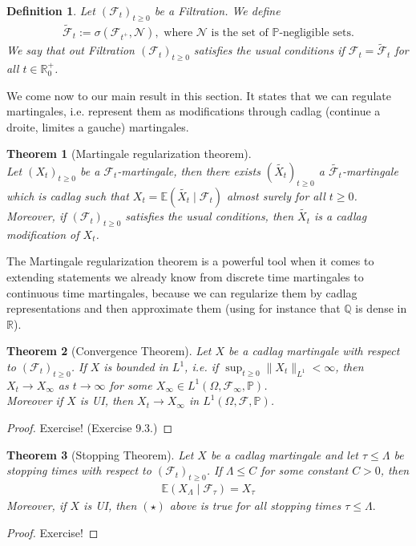 \documentclass[11pt,a4paper, final]{article}
\newtheorem{thm}{Theorem}[section]
\newtheorem{defn}{Definition}[section]
\theoremstyle{definition}
\begin{document}
\begin{defn} Let $(\mathcal{F}_t)_{t \geq 0}$ be a Filtration. We define
\begin{align*}
\tilde{\mathcal{F}}_t := \sigma ( \mathcal{F}_{t^+}, \mathcal{N}), \text{ where } \mathcal{N} \text{ is the set of $\mathbb{P}$-negligible sets}. 
\end{align*}
We say that out Filtration $( \mathcal{F}_t)_{t \geq 0}$ satisfies the usual conditions if $\mathcal{F}_t = \tilde{\mathcal{F}}_t$ for all $t \in \mathbb{R}_0^+$.
\end{defn}
\noindent We come now to our main result in this section. It states that we can regulate martingales, i.e. represent them as modifications through cadlag (continue a droite, limites a gauche) martingales. 
\begin{thm}[Martingale regularization theorem] \ \\ Let $(X_t)_{t \geq 0}$ be a $ \mathcal{F}_t$-martingale, then there exists $(\widetilde{X_t})_{t \geq 0}$ a $\widetilde{\mathcal{F}_t}$-martingale which is cadlag such that $X_t = \mathbb{E}( \widetilde{X_t} \mid \mathcal{F}_t) $ almost surely for all $t \geq 0$. \\
Moreover, if $(\mathcal{F}_t)_{t \geq 0}$ satisfies the usual conditions, then $\widetilde{X_t}$ is a cadlag modification of $X_t$. 
\end{thm}
\newpage
\noindent The Martingale regularization theorem is a powerful tool when it comes to extending statements we already know from discrete time martingales to continuous time martingales, because we can regularize them by cadlag representations and then approximate them (using for instance that $\mathbb{Q}$ is dense in $\mathbb{R}$). 
\begin{thm}[Convergence Theorem] Let $X$ be a cadlag martingale with respect to $( \mathcal{F}_t)_{t \geq 0}$. If $X$ is bounded in $L^1$, i.e. if $\sup_{t \geq 0} \| X_t \|_{L^1} < \infty$, then $X_t \to X_\infty$ as $t \to \infty$ for some $X_\infty \in L^1( \Omega, \mathcal{F}_\infty, \mathbb{P})$. \\
Moreover if $X$ is UI, then $X_t \to X_\infty$ in $L^1( \Omega, \mathcal{F}, \mathbb{P})$. 
\end{thm}
\begin{proof}
Exercise! (Exercise 9.3.)
\end{proof}
\begin{thm}[Stopping Theorem] Let $X$ be a cadlag martingale and let $\tau \leq \Lambda$ be stopping times with respect to $( \mathcal{F}_t)_{t \geq 0}$. If $\Lambda \leq C$ for some constant $C >0$, then 
\begin{align*}
\mathbb{E}(X_\Lambda \mid \mathcal{F}_\tau ) = X_\tau \tag{$\star$}
\end{align*}
Moreover, if $X$ is UI, then $(\star)$ above is true for all stopping times $\tau \leq \Lambda.$ 
\end{thm}
\begin{proof}
Exercise!
\end{proof}
\newpage
\end{document}
